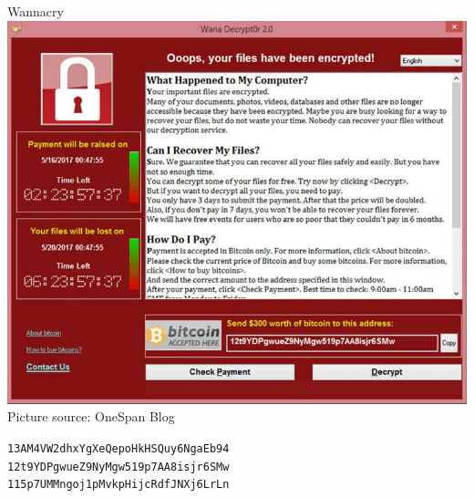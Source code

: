 \documentclass[handout]{beamer}
\begin{document}
\begin{frame}{Wannacry}
	\centering
		\includegraphics[scale=0.28]{../assets/images/wannacry} \\
		\footnotesize{Picture source: OneSpan Blog}\\
		\vspace{1em}
		\begin{small}
			\texttt{13AM4VW2dhxYgXeQepoHkHSQuy6NgaEb94} \link \href{https://blockstream.info/address/13AM4VW2dhxYgXeQepoHkHSQuy6NgaEb94}{} \\
			\texttt{12t9YDPgwueZ9NyMgw519p7AA8isjr6SMw} \link \href{https://blockstream.info/address/12t9YDPgwueZ9NyMgw519p7AA8isjr6SMw}{} \\
			\texttt{115p7UMMngoj1pMvkpHijcRdfJNXj6LrLn} \link \href{https://blockstream.info/address/115p7UMMngoj1pMvkpHijcRdfJNXj6LrLn} {} \\
		\end{small}
\end{frame}
\end{document}
